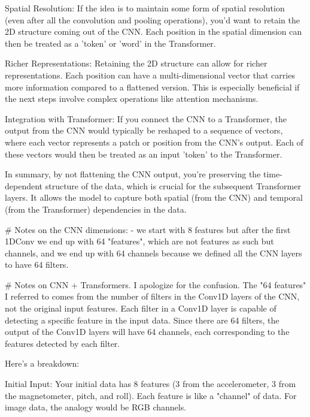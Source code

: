     Spatial Resolution: If the idea is to maintain some form of spatial resolution (even after all the convolution and pooling operations), you'd want to retain the 2D structure coming out of the CNN. Each position in the spatial dimension can then be treated as a 'token' or 'word' in the Transformer.

    Richer Representations: Retaining the 2D structure can allow for richer representations. Each position can have a multi-dimensional vector that carries more information compared to a flattened version. This is especially beneficial if the next steps involve complex operations like attention mechanisms.

    Integration with Transformer: If you connect the CNN to a Transformer, the output from the CNN would typically be reshaped to a sequence of vectors, where each vector represents a patch or position from the CNN's output. Each of these vectors would then be treated as an input 'token' to the Transformer.

In summary, by not flattening the CNN output, you're preserving the time-dependent structure of the data, which is crucial for the subsequent Transformer layers. It allows the model to capture both spatial (from the CNN) and temporal (from the Transformer) dependencies in the data.







# Notes on the CNN dimensions: 
- we start with 8 features but after the first 1DConv we end up with 64 "features", which are not features as such but channels, 
and we end up with 64 channels because we defined all the CNN layers to have 64 filters. 




# Notes on CNN + Transformers. 
I apologize for the confusion. The "64 features" I referred to comes from the number of filters in the Conv1D layers of the CNN, not the original input features. Each filter in a Conv1D layer is capable of detecting a specific feature in the input data. Since there are 64 filters, the output of the Conv1D layers will have 64 channels, each corresponding to the features detected by each filter.

Here’s a breakdown:

    Initial Input: Your initial data has 8 features (3 from the accelerometer, 3 from the magnetometer, pitch, and roll). Each feature is like a "channel" of data. For image data, the analogy would be RGB channels.

